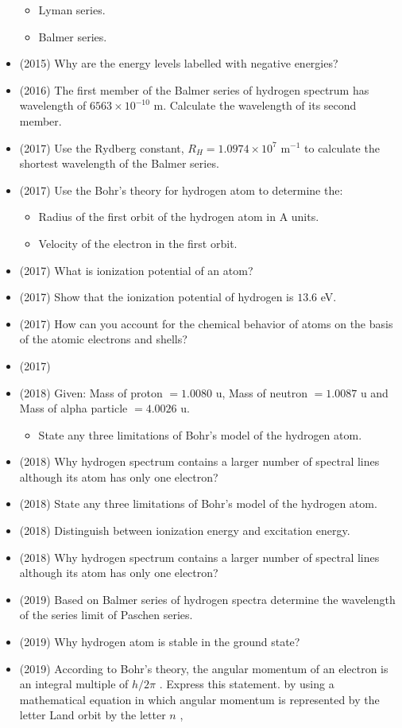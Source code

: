\documentclass{article}
\begin{document}
\begin{itemize}
\begin{itemize}
\item Lyman series. 
\item Balmer series. 
\end{itemize}
\item (2015)  Why are the energy levels labelled with negative energies?
\item (2016)  The first member of the Balmer series of hydrogen spectrum has wavelength of $ 6563 \times 10^{-10}$ m. Calculate the wavelength of its second member.
\item (2017)  Use the Rydberg constant, $ R_{H}=1.0974 \times 10^{7}$ m$ ^{-1}$ to calculate the shortest wavelength of the Balmer series. 
\item (2017)  Use the Bohr's theory for hydrogen atom to determine the:\begin{itemize}
\item Radius of the first orbit of the hydrogen atom in A units. 
\item Velocity of the electron in the first orbit. 
\end{itemize}
\item (2017)  What is ionization potential of an atom?
\item (2017)  Show that the ionization potential of hydrogen is $ 13.6$ eV. 
\item (2017)  How can you account for the chemical behavior of atoms on the basis of the atomic electrons and shells? 
\item (2017)  \item (2018)  Given: Mass of proton $ =1.0080$ u, Mass of neutron $ =1.0087$ u and Mass of alpha particle $ =4.0026$ u.\begin{itemize}
\item State any three limitations of Bohr’s model of the hydrogen atom.
\end{itemize}
\item (2018)  Why hydrogen spectrum contains a larger number of spectral lines although its  atom has only one electron? 
\item (2018)  State any three limitations of Bohr’s model of the hydrogen atom.
\item (2018)  Distinguish between ionization energy and excitation energy.
\item (2018)  Why hydrogen spectrum contains a larger number of spectral lines although its  atom has only one electron? 
\item (2019)  Based on Balmer series of hydrogen spectra determine the wavelength of the series limit of Paschen series. 
\item (2019)  Why hydrogen atom is stable in the ground state? 
\item (2019)  According to Bohr’s theory, the angular momentum of an electron is an integral multiple of $ h/2\pi$ .  Express this statement. by using a mathematical equation in which angular momentum is represented by the letter Land orbit by the letter $ n$ , 
\end{itemize}
\end{document}
